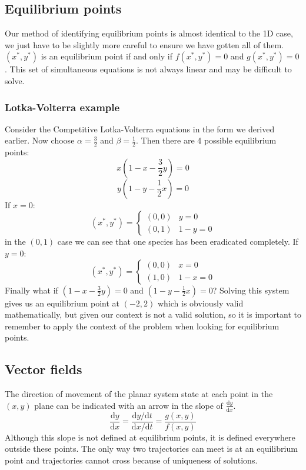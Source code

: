 \documentclass[12pt]{article}
\newcommand{\df}[2]{\frac{\text{d}#1}{\text{d}#2}}
\begin{document}
\subsection*{Equilibrium points}
Our method of identifying equilibrium points is almost identical to the 1D case, we just have to be slightly more careful to ensure we have gotten all of them. \((x^*,y^*)\) is an equilibrium point if and only if \(f(x^*,y^*)=0\) and \(g(x^*,y^*)=0\). This set of simultaneous equations is not always linear and may be difficult to solve.
\subsubsection*{Lotka-Volterra example}
Consider the Competitive Lotka-Volterra equations in the form we derived earlier. Now choose \(\alpha=\frac{3}{2}\) and \(\beta=\frac{1}{2}\). Then there are 4 possible equilibrium points:
\[x(1-x-\frac{3}{2}y)=0\]
\[y(1-y-\frac{1}{2}x)=0\]
If \(x=0\):
\[(x^*,y^*)=\begin{cases}
    (0,0) & y=0 \\
    (0,1) & 1-y=0
\end{cases}\]
in the \((0,1)\) case we can see that one species has been eradicated completely. If \(y=0\):
\[(x^*,y^*)=\begin{cases}
    (0,0) & x=0 \\
    (1,0) & 1-x=0
\end{cases}\]
Finally what if \((1-x-\frac{3}{2}y)=0\) and \((1-y-\frac{1}{2}x)=0\)? Solving this system gives us an equilibrium point at \((-2,2)\) which is obviously valid mathematically, but given our context is not a valid solution, so it is important to remember to apply the context of the problem when looking for equilibrium points.
\subsection*{Vector fields}
The direction of movement of the planar system state at each point in the \((x,y)\) plane can be indicated with an arrow in the slope of \(\df{y}{x}\).
\[\df{y}{x}=\frac{\text{d}y/\text{d}t}{\text{d}x/\text{d}t}=\frac{g(x,y)}{f(x,y)}\]
Although this slope is not defined at equilibrium points, it is defined everywhere outside these points. The only way two trajectories can meet is at an equilibrium point and trajectories cannot cross because of uniqueness of solutions.
\end{document}
